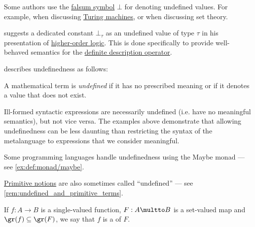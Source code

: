 \begin{comments}
  \item Some authors use the \hyperref[def:propositional_alphabet/constants/falsum]{falsum symbol} \( \bot \) for denoting undefined values. For example, \textcite[99]{Savage2008ModelsOfComputation} when discussing \hyperref[def:turing_machine]{Turing machines}, or \textcite[62]{ШеньВерещагин2020НачалаТеорииМножеств} when discussing set theory.

  \textcite[\S 3.2]{Farmer2008STTVirtues} suggests a dedicated constant \( \bot_\tau \) as an undefined value of type \( \tau \) in his presentation of \hyperref[def:higher_order_logic]{higher-order logic}. This is done specifically to provide well-behaved semantics for the \hyperref[con:description_operator/iota]{definite description operator}.

  \item \Textcite[475]{Farmer2004UndefinednessInCalculus} describes undefinedness as follows:
  \begin{displayquote}
    A mathematical term is \textit{undeﬁned} if it has no prescribed meaning or if it denotes a value that does not exist.
  \end{displayquote}

  \item Ill-formed syntactic expressions are necessarily undefined (i.e. have no meaningful semantics), but not vice versa. The examples above demonstrate that allowing undefinedness can be less daunting than restricting the syntax of the metalanguage to expressions that we consider meaningful.

  \item Some programming languages handle undefinedness using the Maybe monad --- see \cref{ex:def:monad/maybe}.

  \item \hyperref[con:primitive_notion]{Primitive notions} are also sometimes called \enquote{undefined} --- see \cref{rem:undefined_and_primitive_terms}.
\end{comments}

\begin{definition}\label{def:set_valued_selection}
  If \( f: A \to B \) is a single-valued function, \( F: A \multto B \) is a set-valued map and \( \gr(f) \subseteq \gr(F) \), we say that \( f \) is a  of \( F \).
\end{definition}

